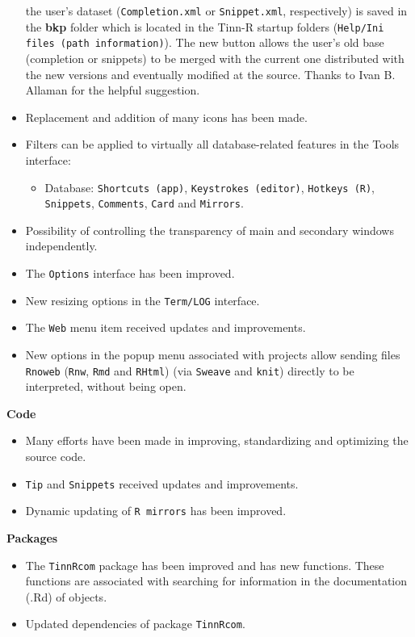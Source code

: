 \begin{itemize}
   the user's dataset (\texttt{Completion.xml} or \texttt{Snippet.xml}, respectively) is saved in the \textbf{bkp} folder which is located
   in the Tinn-R startup folders (\texttt{Help/Ini files (path information)}). The new button allows the user's old base
   (completion or snippets) to be merged with the current one distributed with the new versions and eventually
   modified at the source. Thanks to Ivan B. Allaman for the helpful suggestion.
  \item Replacement and addition of many icons has been made.
  \item Filters can be applied to virtually all database-related features in the Tools interface:
  \begin{itemize}
    \item Database: \texttt{Shortcuts (app)}, \texttt{Keystrokes (editor)}, \texttt{Hotkeys (R)},
     \texttt{Snippets}, \texttt{Comments}, \texttt{Card} and \texttt{Mirrors}.
  \end{itemize}
  \item Possibility of controlling the transparency of main and secondary windows independently.
  \item The \texttt{Options} interface has been improved.
  \item New resizing options in the \texttt{Term/LOG} interface.
  \item The \texttt{Web} menu item received updates and improvements.
  \item New options in the popup menu associated with projects allow sending files \texttt{Rnoweb}
   (\texttt{Rnw}, \texttt{Rmd} and \texttt{RHtml}) (via \texttt{Sweave} and \texttt{knit})
   directly to be interpreted, without being open.
\end{itemize}
   
\textbf{Code}
\begin{itemize}
  \item Many efforts have been made in improving, standardizing and optimizing the source code.
  \item \texttt{Tip} and \texttt{Snippets} received updates and improvements.
  \item Dynamic updating of \texttt{R mirrors} has been improved.
\end{itemize}
       
\textbf{Packages}
\begin{itemize}
  \item The \texttt{TinnRcom} package has been improved and has new functions. These functions are
   associated with searching for information in the documentation (.Rd) of objects.
  \item Updated dependencies of package \texttt{TinnRcom}.
\end{itemize}
   
